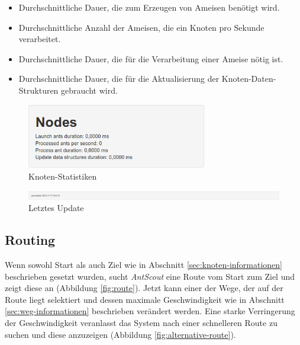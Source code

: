\documentclass[
  a4paper,
  10pt
]{scrreprt}
\begin{document}
\begin{itemize}
  \item Durchschnittliche Dauer, die zum Erzeugen von Ameisen benötigt wird.
  \item Durchschnittliche Anzahl der Ameisen, die ein Knoten pro Sekunde verarbeitet.
  \item Durchschnittliche Dauer, die für die Verarbeitung einer Ameise nötig ist.
  \item Durchschnittliche Dauer, die für die Aktualisierung der Knoten-Daten-Strukturen gebraucht wird.
\end{itemize}

\begin{figure}[htbp]
  \centering
  \includegraphics[width=0.7\textwidth]{Bilder/Knoten-Statistiken.png}
  \caption{Knoten-Statistiken}
  \label{fig:knoten-statistiken}
\end{figure}

\begin{figure}[htbp]
  \centering
  \includegraphics[width=\textwidth]{Bilder/Letztes-Update.png}
  \caption{Letztes Update}
  \label{fig:letztes-update}
\end{figure}

\subsection{Routing}
\label{sec:routing}

Wenn sowohl Start als auch Ziel wie in Abschnitt \ref{sec:knoten-informationen} beschrieben gesetzt wurden, sucht \textit{AntScout} eine Route vom Start zum Ziel und zeigt diese an (Abbildung \ref{fig:route}).
Jetzt kann einer der Wege, der auf der Route liegt selektiert und dessen maximale Geschwindigkeit wie in Abschnitt \ref{sec:weg-informationen} beschrieben verändert werden.
Eine starke Verringerung der Geschwindigkeit veranlasst das System nach einer schnelleren Route zu suchen und diese anzuzeigen (Abbildung \ref{fig:alternative-route}).
\end{document}
